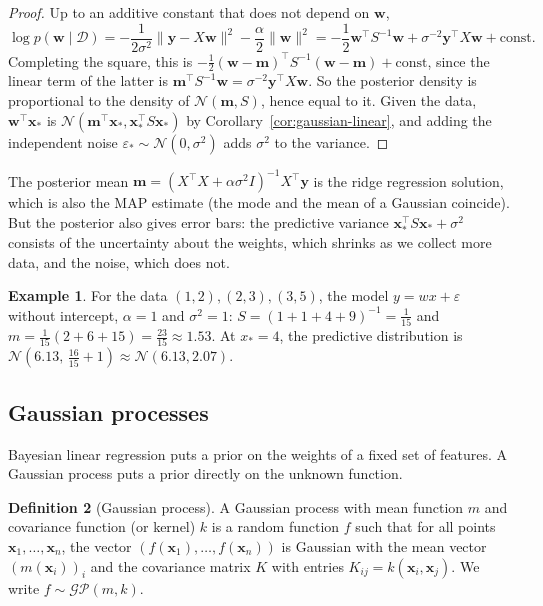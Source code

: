 \documentclass[11pt]{article}
\newcommand{\norm}[1]{\lVert #1 \rVert}
\theoremstyle{definition}
\newtheorem{definition}{Definition}[section]
\newtheorem{example}[definition]{Example}
\theoremstyle{plain}
\theoremstyle{remark}
\begin{document}
\begin{proof}
    Up to an additive constant that does not depend on $\mathbf{w}$,
    \[\log p(\mathbf{w} \mid \mathcal{D}) = -\frac{1}{2\sigma^2}\norm{\mathbf{y} - X\mathbf{w}}^2 - \frac{\alpha}{2}\norm{\mathbf{w}}^2 = -\frac{1}{2}\mathbf{w}^\top S^{-1}\mathbf{w} + \sigma^{-2}\mathbf{y}^\top X\mathbf{w} + \text{const}.\]
    Completing the square, this is $-\frac{1}{2}(\mathbf{w} - \mathbf{m})^\top S^{-1}(\mathbf{w} - \mathbf{m}) + \text{const}$, since the linear term of the latter is $\mathbf{m}^\top S^{-1}\mathbf{w} = \sigma^{-2}\mathbf{y}^\top X\mathbf{w}$. So the posterior density is proportional to the density of $\mathcal{N}(\mathbf{m}, S)$, hence equal to it. Given the data, $\mathbf{w}^\top\mathbf{x}_*$ is $\mathcal{N}(\mathbf{m}^\top\mathbf{x}_*, \mathbf{x}_*^\top S\mathbf{x}_*)$ by Corollary~\ref{cor:gaussian-linear}, and adding the independent noise $\varepsilon_* \sim \mathcal{N}(0, \sigma^2)$ adds $\sigma^2$ to the variance.
\end{proof}

The posterior mean $\mathbf{m} = (X^\top X + \alpha\sigma^2 I)^{-1}X^\top\mathbf{y}$ is the ridge regression solution, which is also the MAP estimate (the mode and the mean of a Gaussian coincide). But the posterior also gives error bars: the predictive variance $\mathbf{x}_*^\top S\mathbf{x}_* + \sigma^2$ consists of the uncertainty about the weights, which shrinks as we collect more data, and the noise, which does not.

\begin{example}\label{ex:blr}
    For the data $(1, 2), (2, 3), (3, 5)$, the model $y = wx + \varepsilon$ without intercept, $\alpha = 1$ and $\sigma^2 = 1$: $S = (1 + 1 + 4 + 9)^{-1} = \frac{1}{15}$ and $m = \frac{1}{15}(2 + 6 + 15) = \frac{23}{15} \approx 1.53$. At $x_* = 4$, the predictive distribution is $\mathcal{N}(6.13, \, \frac{16}{15} + 1) \approx \mathcal{N}(6.13, 2.07)$.
\end{example}

\subsection{Gaussian processes}\label{sec:gp}

Bayesian linear regression puts a prior on the weights of a fixed set of features. A Gaussian process puts a prior directly on the unknown function.

\begin{definition}[Gaussian process]\label{def:gp}
    A Gaussian process with mean function $m$ and covariance function (or kernel) $k$ is a random function $f$ such that for all points $\mathbf{x}_1, \ldots, \mathbf{x}_n$, the vector $(f(\mathbf{x}_1), \ldots, f(\mathbf{x}_n))$ is Gaussian with the mean vector $(m(\mathbf{x}_i))_i$ and the covariance matrix $K$ with entries $K_{ij} = k(\mathbf{x}_i, \mathbf{x}_j)$. We write $f \sim \mathcal{GP}(m, k)$.
\end{definition}
\end{document}
